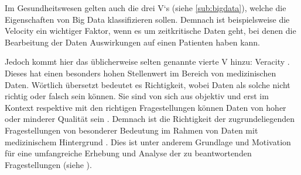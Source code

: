 Im Gesundheitswesen gelten auch die drei \glqq V`s\grqq{} (siehe \ref{sub:bigdata}), welche die Eigenschaften von Big Data klassifizieren sollen.
Demnach ist beispielsweise die \glqq Velocity\grqq{} ein wichtiger Faktor, wenn es um zeitkritische Daten geht, bei denen die Bearbeitung der Daten Auswirkungen auf einen Patienten haben kann.

Jedoch kommt hier das üblicherweise selten genannte vierte V hinzu: Veracity \cite{Hausler.2018}.
Dieses hat einen besonders hohen Stellenwert im Bereich von medizinischen Daten.
Wörtlich übersetzt bedeutet es \glqq Richtigkeit\grqq{}, wobei Daten als solche nicht richtig oder falsch sein können.
Sie sind von sich aus objektiv und erst im Kontext respektive mit den richtigen Fragestellungen können Daten von hoher oder minderer Qualität sein \cite[S.2 ff]{Gitelman.2013}.
Demnach ist die Richtigkeit der zugrundeliegenden Fragestellungen von besonderer Bedeutung im Rahmen von Daten mit medizinischem Hintergrund \cite[2.1]{Hausler.2018}.
Dies ist unter anderem Grundlage und Motivation für eine umfangreiche Erhebung und Analyse der zu beantwortenden Fragestellungen (siehe ).


